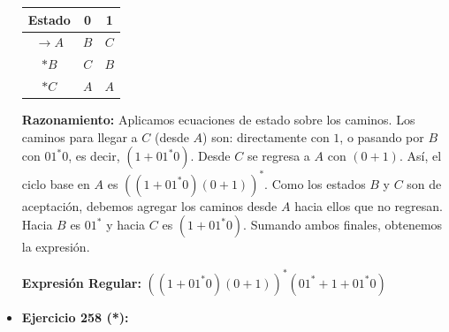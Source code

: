 \documentclass[12pt]{article}
\begin{document}
\begin{itemize}
    \begin{minipage}{0.4\textwidth}
    \begin{tabular}{|c|c|c|}
    \hline
    \textbf{Estado} & \textbf{0} & \textbf{1} \\
    \hline
    $\rightarrow A$ & $B$ & $C$ \\
    \hline
    $*B$ & $C$ & $B$ \\
    \hline
    $*C$ & $A$ & $A$ \\
    \hline
    \end{tabular}
    \end{minipage}
    \begin{minipage}{0.5\textwidth}
    \end{minipage}

    \vspace{0.2cm}
    \textbf{Razonamiento:} Aplicamos ecuaciones de estado sobre los caminos. Los caminos para llegar a $C$ (desde $A$) son: directamente con $1$, o pasando por $B$ con $01^*0$, es decir, $(1+01^*0)$. Desde $C$ se regresa a $A$ con $(0+1)$. Así, el ciclo base en $A$ es $((1+01^*0)(0+1))^*$. Como los estados $B$ y $C$ son de aceptación, debemos agregar los caminos desde $A$ hacia ellos que no regresan. Hacia $B$ es $01^*$ y hacia $C$ es $(1+01^*0)$. Sumando ambos finales, obtenemos la expresión.
    
    \textbf{Expresión Regular:} $((1+01^*0)(0+1))^* (01^* + 1 + 01^*0)$

    \vspace{0.6cm}

    \item \textbf{Ejercicio 258 (*):}
    

\end{itemize}
\end{document}
